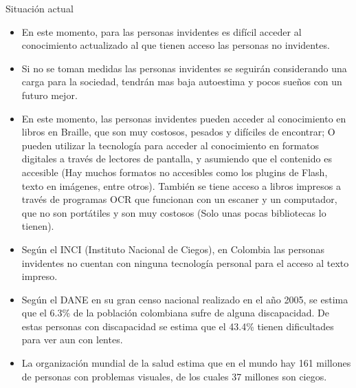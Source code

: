 \documentclass[a4paper, 12pt, oneside]{article}
\begin{document}
	Situación actual
	\begin{itemize}
	\item En este momento, para las personas invidentes es difícil acceder al conocimiento actualizado al que tienen acceso las personas no invidentes. 
	\item Si no se toman medidas las personas invidentes se seguirán considerando una carga para la sociedad, tendrán mas baja autoestima y pocos sueños con un futuro mejor. 
	\item En este momento, las personas invidentes pueden acceder al conocimiento en libros en Braille, que son muy costosos, pesados y difíciles de encontrar; O pueden utilizar la tecnología para acceder al conocimiento en formatos digitales a través de lectores de pantalla, y asumiendo que el contenido es accesible (Hay muchos formatos no accesibles como los plugins de Flash, texto en imágenes, entre otros). También se tiene acceso a libros impresos a través de programas OCR que funcionan con un escaner y un computador, que no son portátiles y son muy costosos (Solo unas pocas bibliotecas lo tienen).
	\item Según el INCI (Instituto Nacional de Ciegos), en Colombia las personas invidentes no cuentan con ninguna tecnología personal para el acceso al texto impreso.
	\item Según el DANE en su gran censo nacional realizado en el año 2005, se estima que el 6.3\% de la población colombiana sufre de alguna discapacidad. De estas personas con discapacidad se estima que el 43.4\% tienen dificultades para ver aun con lentes. 
	\item La organización mundial de la salud estima que en el mundo hay 161 millones de personas con problemas visuales, de los cuales 37 millones son ciegos. 
	\end{itemize}
\end{document}
